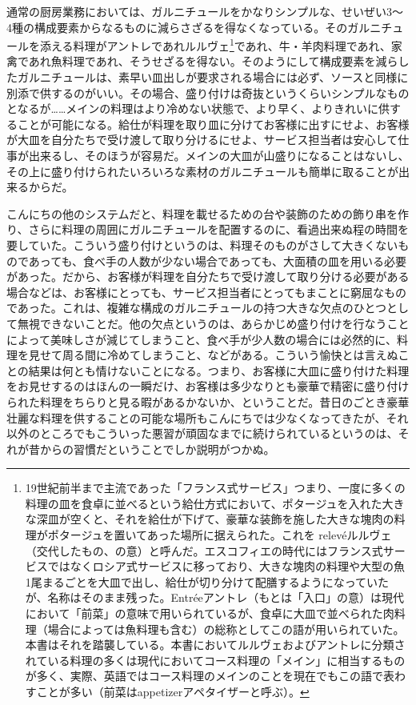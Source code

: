 \begin{Main}
通常の厨房業務においては、ガルニチュールをかなりシンプルな、せいぜい3〜
4種の構成要素からなるものに減らさざるを得なくなっている。そのガルニチュールを添える料理がアントレであれルルヴェ\footnote{19世紀前半まで主流であった「フランス式サービス」つまり、一度に多くの料理の皿を食卓に並べるという給仕方式において、ポタージュを入れた大きな深皿が空くと、それを給仕が下げて、豪華な装飾を施した大きな塊肉の料理がポタージュを置いてあった場所に据えられた。これを
  \protect\hypertarget{releve}{relevé}ルルヴェ（交代したもの、の意）と呼んだ。エスコフィエの時代にはフランス式サービスではなくロシア式サービスに移っており、大きな塊肉の料理や大型の魚1尾まるごとを大皿で出し、給仕が切り分けて配膳するようになっていたが、名称はそのまま残った。Entréeアントレ（もとは「入口」の意）は現代において「前菜」の意味で用いられているが、食卓に大皿で並べられた肉料理（場合によっては魚料理も含む）の総称としてこの語が用いられていた。本書はそれを踏襲している。本書においてルルヴェおよびアントレに分類されている料理の多くは現代においてコース料理の「メイン」に相当するものが多く、実際、英語ではコース料理のメインのことを現在でもこの語で表わすことが多い（前菜はappetizerアペタイザーと呼ぶ）。}であれ、牛・羊肉料理であれ、家禽であれ魚料理であれ、そうせざるを得ない。そのようにして構成要素を減らしたガルニチュールは、素早い皿出しが要求される場合には必ず、ソースと同様に別添で供するのがいい。その場合、盛り付けは奇抜というくらいシンプルなものとなるが\ldots{}\ldots{}メインの料理はより冷めない状態で、より早く、よりきれいに供することが可能になる。給仕が料理を取り皿に分けてお客様に出すにせよ、お客様が大皿を自分たちで受け渡して取り分けるにせよ、サービス担当者は安心して仕事が出来るし、そのほうが容易だ。メインの大皿が山盛りになることはないし、その上に盛り付けられたいろいろな素材のガルニチュールも簡単に取ることが出来るからだ。

こんにちの他のシステムだと、料理を載せるための台や装飾のための飾り串を作り、さらに料理の周囲にガルニチュールを配置するのに、看過出来ぬ程の時間を要していた。こういう盛り付けというのは、料理そのものがさして大きくないものであっても、食べ手の人数が少ない場合であっても、大面積の皿を用いる必要があった。だから、お客様が料理を自分たちで受け渡して取り分ける必要がある場合などは、お客様にとっても、サービス担当者にとってもまことに窮屈なものであった。これは、複雑な構成のガルニチュールの持つ大きな欠点のひとつとして無視できないことだ。他の欠点というのは、あらかじめ盛り付けを行なうことによって美味しさが減じてしまうこと、食べ手が少人数の場合には必然的に、料理を見せて周る間に冷めてしまうこと、などがある。こういう愉快とは言えぬことの結果は何とも情けないことになる。つまり、お客様に大皿に盛り付けた料理をお見せするのはほんの一瞬だけ、お客様は多少なりとも豪華で精密に盛り付けられた料理をちらりと見る暇があるかないか、ということだ。昔日のごとき豪華壮麗な料理を供することの可能な場所もこんにちでは少なくなってきたが、それ以外のところでもこういった悪習が頑固なまでに続けられているというのは、それが昔からの習慣だということでしか説明がつかぬ。


\end{Main}
